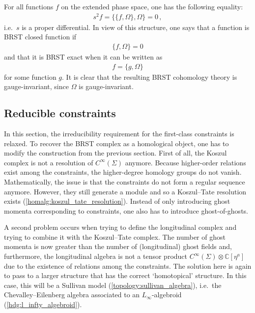     \begin{property}
        For all functions $f$ on the extended phase space, one has the following equality:
        \begin{gather}
            s^2f = \{\{f,\Omega\},\Omega\} = 0\,,
        \end{gather}
        i.e.~$s$ is a proper differential. In view of this structure, one says that a function is BRST closed function if
        \begin{gather}
            \{f,\Omega\} = 0
        \end{gather}
        and that it is BRST exact when it can be written as
        \begin{gather}
            f = \{g,\Omega\}
        \end{gather}
        for some function $g$. It is clear that the resulting BRST cohomology theory is gauge-invariant, since $\Omega$ is gauge-invariant.
    \end{property}

\subsection{Reducible constraints}

    In this section, the irreducibility requirement for the first-class constraints is relaxed. To recover the BRST complex as a homological object, one has to modify the construction from the previous section. First of all, the Koszul complex is not a resolution of $C^\infty(\Sigma)$ anymore. Because higher-order relations exist among the constraints, the higher-degree homology groups do not vanish. Mathematically, the issue is that the constraints do not form a regular sequence anymore. However, they still generate a module and so a Koszul--Tate resolution exists (\cref{homalg:koszul_tate_resolution}). Instead of only introducing ghost momenta corresponding to constraints, one also has to introduce ghost-of-ghosts.

    A second problem occurs when trying to define the longitudinal complex and trying to combine it with the Koszul--Tate complex. The number of ghost momenta is now greater than the number of (longitudinal) ghost fields and, furthermore, the longitudinal algebra is not a tensor product $C^\infty(\Sigma)\otimes\mathbb{C}[\eta^a]$ due to the existence of relations among the constraints. The solution here is again to pass to a larger structure that has the correct `homotopical' structure. In this case, this will be a Sullivan model (\cref{topology:sullivan_algebra}), i.e.~the Chevalley--Eilenberg algebra associated to an $L_\infty$-algebroid (\cref{hdg:l_infty_algebroid}).

